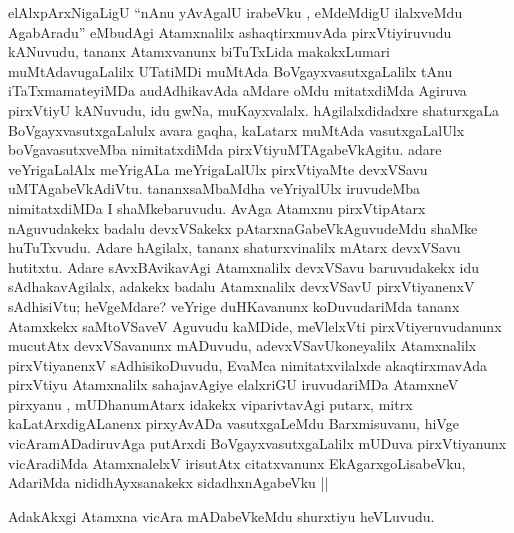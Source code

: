 \begin{center}


\end{center}


\begin{artha}
elAlxpArxNigaLigU ``nAnu yAvAgalU irabeVku , eMdeMdigU ilalxveMdu AgabAradu'' 
eMbudAgi Atamxnalilx ashaqtirxmuvAda pirxVtiyiruvudu kANuvudu, tananx
Atamxvanunx biTuTxLida makakxLumari muMtAdavugaLalilx UTatiMDi muMtAda
BoVgayxvasutxgaLalilx tAnu iTaTxmamateyiMDa audAdhikavAda aMdare oMdu
mitatxdiMda Agiruva pirxVtiyU kANuvudu, idu gwNa,
muKayxvalalx. hAgilalxdidadxre shaturxgaLa BoVgayxvasutxgaLalulx avara
gaqha, kaLatarx muMtAda vasutxgaLalUlx boVgavasutxveMba nimitatxdiMda
pirxVtiyuMTAgabeVkAgitu. adare veYrigaLalAlx meYrigALa meYrigaLalUlx
pirxVtiyaMte devxVSavu uMTAgabeVkAdiVtu. tananxsaMbaMdha veYriyalUlx
iruvudeMba nimitatxdiMDa I shaMkebaruvudu. AvAga Atamxnu pirxVtipAtarx
nAguvudakekx badalu devxVSakekx pAtarxnaGabeVkAguvudeMdu shaMke
huTuTxvudu. Adare hAgilalx, tananx shaturxvinalilx mAtarx devxVSavu
hutitxtu. Adare sAvxBAvikavAgi Atamxnalilx devxVSavu baruvudakekx idu
sAdhakavAgilalx, adakekx badalu Atamxnalilx devxVSavU pirxVtiyanenxV
sAdhisiVtu; heVgeMdare? veYrige duHKavanunx koDuvudariMda tananx
Atamxkekx saMtoVSaveV Aguvudu kaMDide, meVlelxVti pirxVtiyeruvudanunx
mucutAtx devxVSavanunx mADuvudu, adevxVSavUkoneyalilx Atamxnalilx
pirxVtiyanenxV sAdhisikoDuvudu, EvaMca nimitatxvilalxde akaqtirxmavAda
pirxVtiyu Atamxnalilx sahajavAgiye elalxriGU iruvudariMDa AtamxneV
pirxyanu , mUDhanumAtarx idakekx viparivtavAgi putarx, mitrx
kaLatArxdigALanenx pirxyAvADa vasutxgaLeMdu Barxmisuvanu, hiVge
vicAramADadiruvAga putArxdi BoVgayxvasutxgaLalilx mUDuva pirxVtiyanunx
vicAradiMda AtamxnalelxV irisutAtx citatxvanunx EkAgarxgoLisabeVku,
AdariMda nididhAyxsanakekx sidadhxnAgabeVku ||

AdakAkxgi Atamxna vicAra mADabeVkeMdu shurxtiyu heVLuvudu.
\end{artha}


